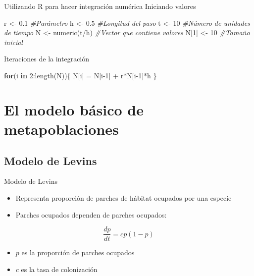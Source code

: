 \documentclass[
  11pt,
  ignorenonframetext,
]{beamer}
\newenvironment{Shaded}{}{}
\newcommand{\CommentTok}[1]{\textcolor[rgb]{0.38,0.63,0.69}{\textit{#1}}}
\newcommand{\ControlFlowTok}[1]{\textcolor[rgb]{0.00,0.44,0.13}{\textbf{#1}}}
\newcommand{\DecValTok}[1]{\textcolor[rgb]{0.25,0.63,0.44}{#1}}
\newcommand{\FloatTok}[1]{\textcolor[rgb]{0.25,0.63,0.44}{#1}}
\newcommand{\FunctionTok}[1]{\textcolor[rgb]{0.02,0.16,0.49}{#1}}
\newcommand{\NormalTok}[1]{#1}
\newcommand{\OtherTok}[1]{\textcolor[rgb]{0.00,0.44,0.13}{#1}}
\newcommand{\SpecialCharTok}[1]{\textcolor[rgb]{0.25,0.44,0.63}{#1}}
\begin{document}
\begin{frame}[fragile]{Utilizando R para hacer integración numérica}
Iniciando valores

\begin{Shaded}
\begin{Highlighting}[]
\NormalTok{r }\OtherTok{\textless{}{-}} \FloatTok{0.1} \CommentTok{\#Parámetro}
\NormalTok{h }\OtherTok{\textless{}{-}} \FloatTok{0.5} \CommentTok{\#Longitud del paso}
\NormalTok{t }\OtherTok{\textless{}{-}} \DecValTok{10} \CommentTok{\#Número de unidades de tiempo}
\NormalTok{N }\OtherTok{\textless{}{-}} \FunctionTok{numeric}\NormalTok{(t}\SpecialCharTok{/}\NormalTok{h) }\CommentTok{\#Vector que contiene valores}
\NormalTok{N[}\DecValTok{1}\NormalTok{] }\OtherTok{\textless{}{-}} \DecValTok{10} \CommentTok{\#Tamaño inicial}
\end{Highlighting}
\end{Shaded}

Iteraciones de la integración

\begin{Shaded}
\begin{Highlighting}[]
\ControlFlowTok{for}\NormalTok{(i }\ControlFlowTok{in} \DecValTok{2}\SpecialCharTok{:}\FunctionTok{length}\NormalTok{(N))\{}
\NormalTok{      N[i] }\OtherTok{=}\NormalTok{ N[i}\DecValTok{{-}1}\NormalTok{] }\SpecialCharTok{+}\NormalTok{ r}\SpecialCharTok{*}\NormalTok{N[i}\DecValTok{{-}1}\NormalTok{]}\SpecialCharTok{*}\NormalTok{h}
\NormalTok{  \}}
\end{Highlighting}
\end{Shaded}
\end{frame}

\hypertarget{el-modelo-buxe1sico-de-metapoblaciones}{%
\section{El modelo básico de
metapoblaciones}\label{el-modelo-buxe1sico-de-metapoblaciones}}

\hypertarget{modelo-de-levins}{%
\subsection{Modelo de Levins}\label{modelo-de-levins}}

\begin{frame}{Modelo de Levins}
\begin{itemize}
\item
  Representa proporción de parches de hábitat ocupados por una especie
\item
  Parches ocupados dependen de parches ocupados:
\end{itemize}

\[\frac{dp}{dt} = cp(1-p)\]

\begin{itemize}
\item
  \(p\) es la proporción de parches ocupados
\item
  \(c\) es la tasa de colonización
\end{itemize}
\end{frame}
\end{document}
